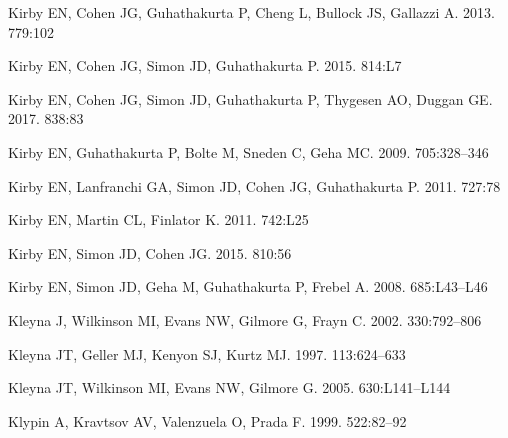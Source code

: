 \documentclass[a4paper]{ar-1col}
\begin{document}
\begin{thebibliography}{}
{Kirby} EN, {Cohen} JG, {Guhathakurta} P, {Cheng} L, {Bullock} JS, {Gallazzi}
  A. 2013{}.
\textit{\apj} 779:102

{Kirby} EN, {Cohen} JG, {Simon} JD, {Guhathakurta} P. 2015.
\textit{\apjl} 814:L7

{Kirby} EN, {Cohen} JG, {Simon} JD, {Guhathakurta} P, {Thygesen} AO, {Duggan}
  GE. 2017.
\textit{\apj} 838:83

{Kirby} EN, {Guhathakurta} P, {Bolte} M, {Sneden} C, {Geha} MC. 2009.
\textit{\apj} 705:328--346

{Kirby} EN, {Lanfranchi} GA, {Simon} JD, {Cohen} JG, {Guhathakurta} P. 2011.
\textit{\apj} 727:78

{Kirby} EN, {Martin} CL, {Finlator} K. 2011.
\textit{\apjl} 742:L25

{Kirby} EN, {Simon} JD, {Cohen} JG. 2015.
\textit{\apj} 810:56

{Kirby} EN, {Simon} JD, {Geha} M, {Guhathakurta} P, {Frebel} A. 2008.
\textit{\apjl} 685:L43--L46

{Kleyna} J, {Wilkinson} MI, {Evans} NW, {Gilmore} G, {Frayn} C. 2002.
\textit{\mnras} 330:792--806

{Kleyna} JT, {Geller} MJ, {Kenyon} SJ, {Kurtz} MJ. 1997.
\textit{\aj} 113:624--633

{Kleyna} JT, {Wilkinson} MI, {Evans} NW, {Gilmore} G. 2005.
\textit{\apjl} 630:L141--L144

{Klypin} A, {Kravtsov} AV, {Valenzuela} O, {Prada} F. 1999.
\textit{\apj} 522:82--92


\end{thebibliography}
\end{document}
